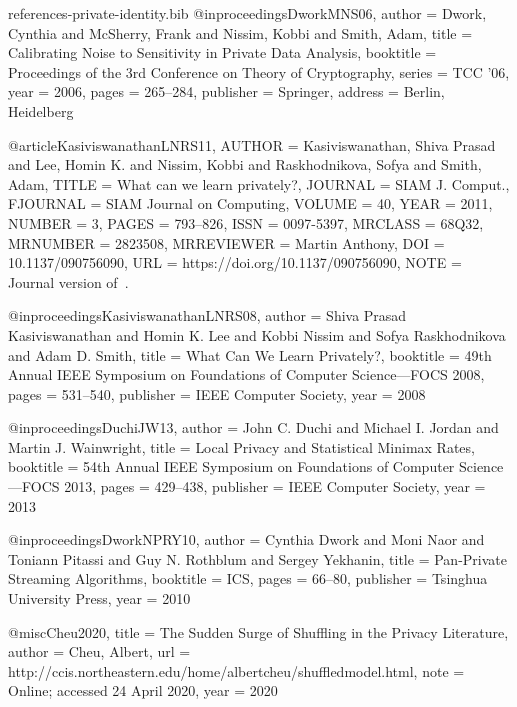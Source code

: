 \documentclass[10pt]{article}
\begin{document}
\begin{filecontents}{references-private-identity.bib}
@inproceedings{DworkMNS06,
  author        = {Dwork, Cynthia and McSherry, Frank and Nissim, Kobbi and Smith, Adam},
  title         = {Calibrating Noise to Sensitivity in Private Data Analysis},
  booktitle     = {Proceedings of the 3rd Conference on Theory of Cryptography},
  series        = {TCC '06},
  year          = {2006},
  pages         = {265--284},
  publisher     = {Springer},
  address       = {Berlin, Heidelberg}
}


@article{KasiviswanathanLNRS11,
    AUTHOR = {Kasiviswanathan, Shiva Prasad and Lee, Homin K. and Nissim,
              Kobbi and Raskhodnikova, Sofya and Smith, Adam},
     TITLE = {What can we learn privately?},
   JOURNAL = {SIAM J. Comput.},
  FJOURNAL = {SIAM Journal on Computing},
    VOLUME = {40},
      YEAR = {2011},
    NUMBER = {3},
     PAGES = {793--826},
      ISSN = {0097-5397},
   MRCLASS = {68Q32},
  MRNUMBER = {2823508},
MRREVIEWER = {Martin Anthony},
       DOI = {10.1137/090756090},
       URL = {https://doi.org/10.1137/090756090},
      NOTE = {Journal version of~\cite{KasiviswanathanLNRS08}.}
}

@inproceedings{KasiviswanathanLNRS08,
  author    = {Shiva Prasad Kasiviswanathan and
               Homin K. Lee and
               Kobbi Nissim and
               Sofya Raskhodnikova and
               Adam D. Smith},
  title     = {What Can We Learn Privately?},
  booktitle = {49th Annual IEEE Symposium on Foundations of Computer Science---{FOCS} 2008}, 
  pages     = {531--540},
  publisher = {{IEEE} Computer Society},
  year      = {2008}
}

@inproceedings{DuchiJW13,
  author    = {John C. Duchi and
               Michael I. Jordan and
               Martin J. Wainwright},
  title     = {Local Privacy and Statistical Minimax Rates},
  booktitle = {54th Annual IEEE Symposium on Foundations of Computer Science---{FOCS} 2013}, 
  pages     = {429--438},
  publisher = {{IEEE} Computer Society},
  year      = {2013}
}

@inproceedings{DworkNPRY10,
  author    = {Cynthia Dwork and
               Moni Naor and
               Toniann Pitassi and
               Guy N. Rothblum and
               Sergey Yekhanin},
  title     = {Pan-Private Streaming Algorithms},
  booktitle = {{ICS}},
  pages     = {66--80},
  publisher = {Tsinghua University Press},
  year      = {2010}
}

@misc{Cheu2020,
     title = {{The Sudden Surge of Shuffling in the Privacy Literature}},
    author = {Cheu, Albert},
    url    = {http://ccis.northeastern.edu/home/albertcheu/shuffledmodel.html},
    note   = {Online; accessed 24 April 2020}, 
    year   = {2020}
}


\end{filecontents}
\end{document}
